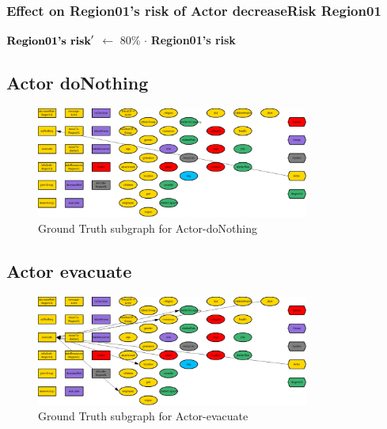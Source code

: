 \documentclass{article}%
\begin{document}
%
\subsubsection{Effect on Region01's risk of Actor decreaseRisk Region01}%
\label{ssubsec:Effect on Region01's risk of Actor decreaseRisk Region01}%
\begin{flushleft}%
$\mbox{\textbf{Region01's risk}} '$%
$\leftarrow$%
80\%%
$\cdot$%
\textbf{Region01's risk}%
\end{flushleft}

%
\subsection{Actor doNothing}%
\label{subsec:Actor doNothing}%


\begin{figure}[ht]%
\centering%
\includegraphics[width=0.8\textwidth]{images/Actor-doNothing.png}%
\caption{Ground Truth subgraph for Actor{-}doNothing}%
\end{figure}

%
\subsection{Actor evacuate}%
\label{subsec:Actor evacuate}%


\begin{figure}[ht]%
\centering%
\includegraphics[width=0.8\textwidth]{images/Actor-evacuate.png}%
\caption{Ground Truth subgraph for Actor{-}evacuate}%
\end{figure}

%
\end{document}
